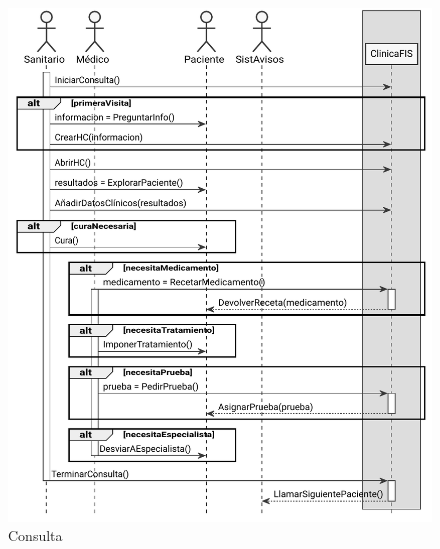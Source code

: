 \documentclass[11pt,a4paper]{article}
\begin{document}
\begin{figure}[H]
	\caption{Consulta}
	\centering
  \includegraphics[width=\textwidth,height=\textheight,keepaspectratio]{diagramas/pdf/diagramaConsulta.pdf}
\end{figure}
\end{document}
